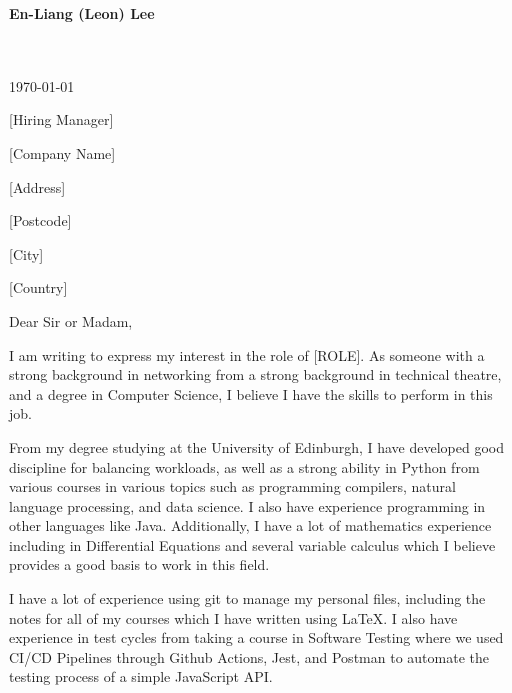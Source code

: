 \documentclass[10pt,english]{article}
\begin{document}
\setlength{\columnsep}{2.2em}
\setlength{\columnseprule}{4pt}



\newpage

\setlength{\columnsep}{2.2em}
\setlength{\columnseprule}{4pt}

\begin{minipage}[c][2.5cm][c]{1\mpwidth}
	\LARGE{\textbf{\textcolor{maincol}{En-Liang (Leon) Lee}}} \\[2pt]
	\normalsize{}\\
	\\
\end{minipage}

\bigskip

\begin{minipage}[c][2.5cm][c]{1\mpwidth}
	\today
	\bigskip

	[Hiring Manager]

	[Company Name]

	[Address]

	[Postcode]

	[City]

	[Country]
\end{minipage}
\bigskip\bigskip

Dear Sir or Madam,
\medskip

I am writing to express my interest in the role of [ROLE]. As someone with a strong background in networking from a strong background in technical theatre, and a degree in Computer Science, I believe I have the skills to perform in this job.

\medskip

From my degree studying at the University of Edinburgh, I have developed good discipline for balancing workloads, as well as a strong ability in Python from various courses in various topics such as programming compilers, natural language processing, and data science. I also have experience programming in other languages like Java. Additionally, I have a lot of mathematics experience including in Differential Equations and several variable calculus which I believe provides a good basis to work in this field.

I have a lot of experience using git to manage my personal files, including the notes for all of my courses which I have written using LaTeX. I also have experience in test cycles from taking a course in Software Testing where we used CI/CD Pipelines through Github Actions, Jest, and Postman to automate the testing process of a simple JavaScript API.
\end{document}
